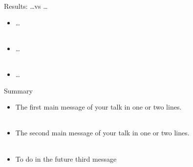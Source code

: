 \documentclass{beamer}
\begin{document}
\begin{frame}{Results: \dots vs \dots}

    \begin{itemize}
        \item \dots \\ ~
        \item \dots \\ ~
        \item \dots
    \end{itemize}
\end{frame}

\begin{frame}{Summary}

  \begin{itemize}
  \item
    The \alert{first main message} of your talk in one or two lines. \\ ~
  \item
    The \alert{second main message} of your talk in one or two lines. \\ ~
  \item
    To do in the future \alert{third message}
  \end{itemize}
  
\end{frame}
\end{document}
